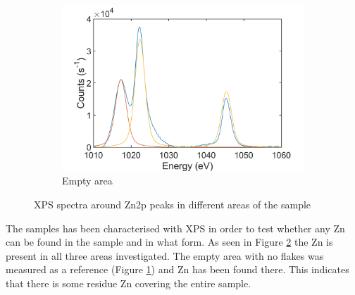 \begin{figure}[!h]
\begin{center}
		\begin{subfigure}[b]{0.25\textwidth}
			\includegraphics[scale=0.2]{WSe2/WSe2XPSRefZn.png}
			\caption{Empty area}
			\label{fig:WSe2XPSRefZn}
		\end{subfigure}
		\caption{XPS spectra around Zn2p peaks in different areas of the sample}
		\label{fig:WSe2XPSSpectra}
	\end{center}
\end{figure}

The samples has been characterised with XPS in order to test whether any Zn can be found in the sample and in what form. As seen in Figure \ref{fig:WSe2XPSSpectra} the Zn is present in all three areas investigated. The empty area with no flakes was measured as a reference (Figure \ref{fig:WSe2XPSRefZn}) and Zn has been found there. This indicates that there is some residue Zn covering the entire sample. 
